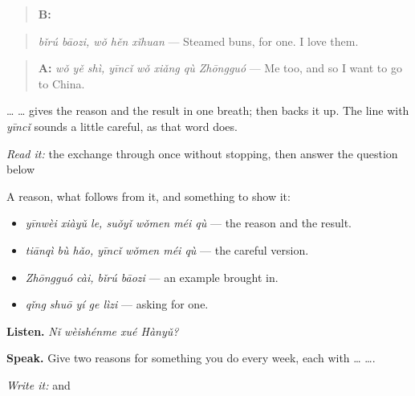 \begin{quote}
\textbf{B:}  
\end{quote}

\begin{quote}
\emph{bǐrú bāozi, wǒ hěn xǐhuan} — Steamed buns, for one. I love them.
\end{quote}

\begin{quote}
\textbf{A:} \emph{wǒ yě shì, yīncǐ wǒ xiǎng qù Zhōngguó} — Me too, and so I want to go to China.
\end{quote}

 …  … gives the reason and the result in one breath;  then backs it up. The line with \emph{yīncǐ} sounds a little careful, as that word does.

\begin{tcolorbox}[breakable,skin=enhanced,colback=orange!6,colframe=orange!45!black,boxrule=0.5pt,arc=1mm,left=6pt,right=6pt,top=4pt,bottom=4pt,fonttitle=\bfseries,title={Read this}]
\emph{Read it:} the exchange through once without stopping, then answer the question below
\end{tcolorbox}

\begin{grammarlens}[title={What you've built — a reason and an example}]
A reason, what follows from it, and something to show it:

\begin{itemize}
\raggedright
  \item \textbf{ } \emph{yīnwèi xiàyǔ le, suǒyǐ wǒmen méi qù} — the reason and the result.
  \item \emph{tiānqì bù hǎo, yīncǐ wǒmen méi qù} — the careful version.
  \item \textbf{ } \emph{Zhōngguó cài, bǐrú bāozi} — an example brought in.
  \item \emph{qǐng shuō yí ge lìzi} — asking for one.
\end{itemize}

\textbf{Listen.} \emph{Nǐ wèishénme xué Hànyǔ?}

\textbf{Speak.} Give two reasons for something you do every week, each with  …  ….

\emph{Write it:}  and 
\end{grammarlens}

